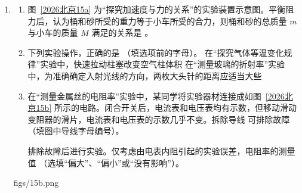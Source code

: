 \documentclass[\gkver]{gaokaozhenti}
\begin{document}
\begin{enumerate}
{故选 B。
}
\item
\begin{enumerate}
	\item
	图~\ref{2026北京15a} 为“探究加速度与力的关系”的实验装置示意图。平衡阻力后，认为桶和砂所受的重力等于小车所受的合力，则桶和砂的总质量 $m$ 与小车的质量 $M$ 满足的关系是 。
	\item
	下列实验操作，正确的是 （填选项前的字母）。
	{在“探究气体等温变化规律”实验中，快速拉动柱塞改变空气柱体积}
	{在“测量玻璃的折射率”实验中，为准确确定入射光线的方向，两枚大头针的距离应适当大些}
	\item
	在“测量金属丝的电阻率”实验中，某同学将实验器材连接成如图~\ref{2026北京15b} 所示的电路。闭合开关后，电流表和电压表均有示数，但移动滑动变阻器的滑片，电流表和电压表的示数几乎不变。拆除导线  可排除故障（填图中导线字母编号）。

	排除故障后进行实验。仅考虑由电表内阻引起的实验误差，电阻率的测量值 （选填“偏大”、“偏小”或“没有影响”）。
\end{enumerate}
{figs/15b.png}
\end{enumerate}
\end{document}
